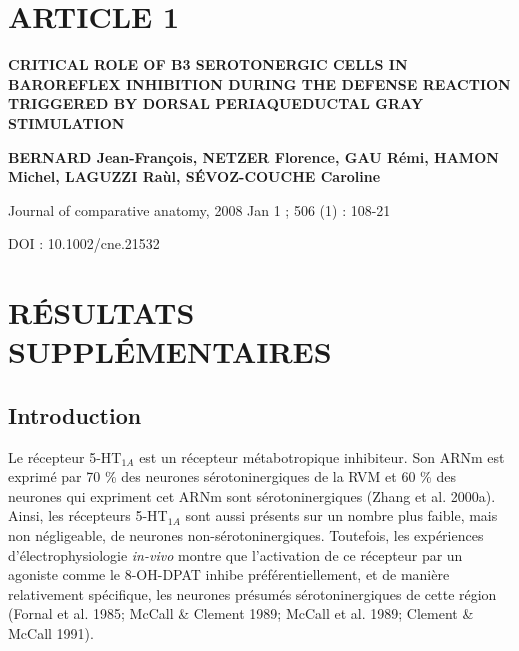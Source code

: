 \documentclass[a4paper,12pt,twoside]{report}
\begin{document}
\cleardoublepage

\section{ARTICLE 1}

\vfill

\begin{center}

\begin{LARGE}
\textbf{CRITICAL ROLE OF B3 SEROTONERGIC CELLS IN BAROREFLEX INHIBITION DURING THE DEFENSE REACTION TRIGGERED BY DORSAL PERIAQUEDUCTAL GRAY STIMULATION}
\end{LARGE}

\bigskip

\begin{large} 
\textbf{BERNARD Jean-François, NETZER Florence, GAU Rémi, HAMON Michel, LAGUZZI Raùl, SÉVOZ-COUCHE Caroline} \end{large}

\bigskip

Journal of comparative anatomy, 2008 Jan 1 ; 506 (1) : 108-21

DOI : 10.1002/cne.21532

\vfill

\end{center}

\cleardoublepage



\cleardoublepage

\section{RÉSULTATS SUPPLÉMENTAIRES}

\subsection{Introduction}

Le récepteur 5-HT$_{1A}$ est un récepteur métabotropique inhibiteur. Son ARNm est exprimé par 70 \% des neurones sérotoninergiques de la RVM et 60 \% des neurones qui expriment cet ARNm sont sérotoninergiques (Zhang et al. 2000a). Ainsi, les récepteurs 5-HT$_{1A}$ sont aussi présents sur un nombre plus faible, mais non négligeable, de neurones non-sérotoninergiques. Toutefois, les expériences d’électrophysiologie \textit{in-vivo} montre que l’activation de ce récepteur par un agoniste comme le 8-OH-DPAT inhibe préférentiellement, et de manière relativement spécifique, les neurones présumés sérotoninergiques de cette région (Fornal et al. 1985; McCall \& Clement 1989; McCall et al. 1989; Clement \& McCall 1991).
\end{document}

